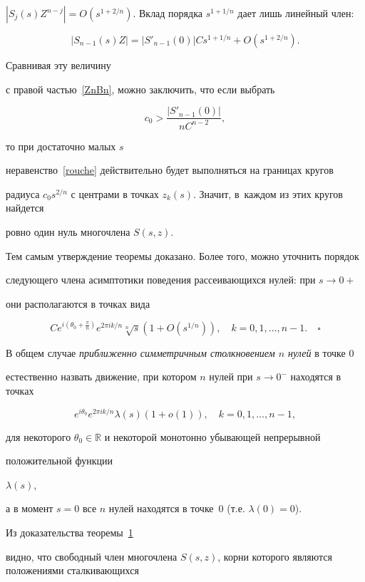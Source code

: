 $|S_j(s)Z^{n-j}|=O(s^{1+2/n})$. Вклад порядка $s^{1+1/n}$ дает лишь линейный член:

$$|S_{n-1}(s)Z|=|S'_{n-1}(0)|Cs^{1+1/n}+O(s^{1+2/n}).$$ 

Сравнивая эту величину

с правой частью~\eqref{ZnBn}, можно заключить, что если выбрать 

$$c_0>\dfrac{|S'_{n-1}(0)|}{nC^{n-2}},$$ 

то при достаточно малых $s$

неравенство~\eqref{rouche} действительно будет выполняться на границах кругов

радиуса $c_0s^{2/n}$ с центрами в точках $z_k(s)$. Значит, в~каждом из этих кругов найдется

ровно один нуль многочлена $S(s,z)$.



Тем самым утверждение теоремы доказано. Более того, можно уточнить порядок 

следующего члена асимптотики поведения рассеивающихся нулей: при $s\to0+$

они располагаются в точках вида

$$Ce^{i(\theta_0+\frac\pi n)}e^{2\pi ik/n}\sqrt[n]{s}(1+O(s^{1/n})),\quad k=0, 1,\dots,n-1.\quad \square$$ 






\smallskip



В общем случае \textit{приближенно симметричным столкновением $n$ нулей} в точке $0$

естественно назвать движение, при котором $n$ нулей при $s\to 0^-$ находятся в точках

$$e^{i\theta_0}e^{2\pi ik/n}\lambda(s)(1+o(1)),\quad k=0, 1,\dots,n-1,$$

для некоторого $\theta_0\in\mathbb R$ и некоторой монотонно убывающей непрерывной

положительной функции 

$\lambda(s)$,

а в момент $s=0$ все $n$ нулей находятся в точке~$0$ (т.е. $\lambda(0)=0$). 

 Из доказательства теоремы~\hyperlink{localscatteringtheorem}{1}

видно, что свободный член многочлена $S(s,z)$, корни которого являются положениями сталкивающихся

